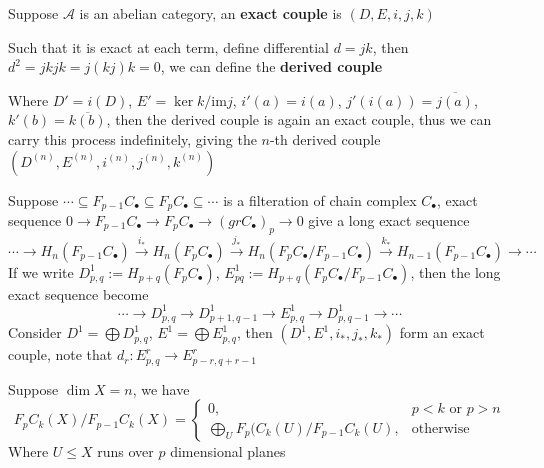 \documentclass[../main.tex]{subfiles}
\begin{document}
\begin{definition}
Suppose $\mathscr A$ is an abelian category, an \textbf{exact couple} is $(D,E,i,j,k)$
\begin{center}
\end{center}
Such that it is exact at each term, define differential $d=jk$, then $d^2=jkjk=j(kj)k=0$, we can define the \textbf{derived couple}
\begin{center}
\end{center}
Where $D'=i(D)$, $E'=\ker k/\mathrm{im}j$, $i'(a)=i(a)$, $j'(i(a))=\overline{j(a)}$, $k'(b)=\overline{k(b)}$, then the derived couple is again an exact couple, thus we can carry this process indefinitely, giving the $n$-th derived couple $(D^{(n)},E^{(n)},i^{(n)},j^{(n)},k^{(n)})$
\end{definition}

\begin{example}
Suppose $\cdots\subseteq F_{p-1}C_\bullet\subseteq F_{p}C_\bullet\subseteq\cdots$ is a filteration of chain complex $C_\bullet$, exact sequence $0\to F_{p-1}C_\bullet\to F_{p}C_\bullet\to (grC_\bullet)_p\to0$ give a long exact sequence
\[\cdots\to H_n(F_{p-1}C_\bullet)\xrightarrow{i_*} H_n(F_{p}C_\bullet)\xrightarrow{j_*} H_n(F_{p}C_\bullet/ F_{p-1}C_\bullet)\xrightarrow{k_*} H_{n-1}(F_{p-1}C_\bullet)\to\cdots\]
If we write $D^1_{p,q}:=H_{p+q}(F_pC_\bullet)$, $E^1_{pq}:=H_{p+q}(F_{p}C_\bullet/ F_{p-1}C_\bullet)$, then the long exact sequence become
\[\cdots\to D^1_{p,q}\to D^1_{p+1,q-1}\to E^1_{p,q}\to D^1_{p,q-1}\to\cdots\]
Consider $D^1=\bigoplus D^1_{p,q}$, $E^1=\bigoplus E^1_{p,q}$, then $(D^1,E^1,i_*,j_*,k_*)$ form an exact couple, note that $d_r:E^r_{p,q}\to E^r_{p-r,q+r-1}$
\end{example}

\begin{lemma}
Suppose $\dim X=n$, we have
\[F_{p}C_k(X)/F_{p-1}C_k(X)=\begin{cases}
0, &p<k\text{ or }p>n \\
\displaystyle \bigoplus_{U}F_{p}(C_k(U)/F_{p-1}C_k(U), &\text{otherwise}
\end{cases}\]
Where $U\leq X$ runs over $p$ dimensional planes
\end{lemma}
\end{document}
